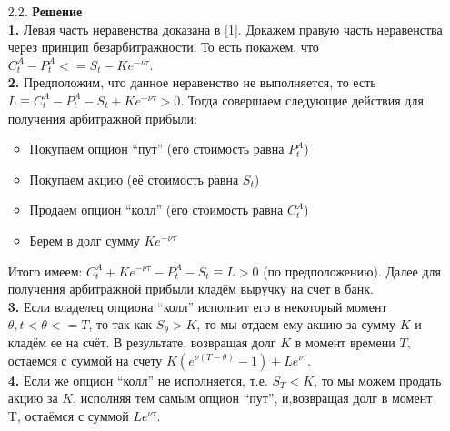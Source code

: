 \documentclass[12pt,a4 paper]{book}
\begin{document}
\begin{enumerate}
\item[2.2.] \textbf{Решение}
\smallskip
\\\textbf{1.} Левая часть неравенства доказана в [1]. Докажем правую часть неравенства через принцип безарбитражности. То есть покажем, что $C^{A}_t-P^{A}_t<=S_t - Ke^{-\nu\tau}$.\\
    \textbf{2.} Предположим, что данное неравенство не выполняется, то есть $L \equiv C^{A}_t - P^{A}_t -S_t+Ke^{-\nu\tau}>0$. Тогда совершаем следующие действия для получения арбитражной прибыли:
    \begin{itemize}
        \item Покупаем опцион “пут” (его стоимость равна $P^{A}_t$)
        \item Покупаем акцию (её стоимость равна $S_t$)
        \item Продаем опцион “колл” (его стоимость равна $C^{A}_t$)
        \item Берем в долг сумму $Ke^{-\nu\tau}$
    \end{itemize}
    Итого имеем: $C^{A}_t+Ke^{-\nu\tau} - P^{A}_t -S_t \equiv L > 0$ (по предположению). Далее для получения арбитражной прибыли кладём выручку на счет в банк.\\
    \textbf{3.} Если владелец опциона “колл” исполнит его в некоторый момент $\theta, t<\theta<=T$, то так как $S_{\theta}>K$, то мы отдаем ему акцию за сумму $K$ и кладём ее на счёт. В результате, возвращая долг $K$ в момент времени $T$, остаемся с суммой на счету $K(e^{\nu(T-\theta)}-1)+Le^{\nu\tau}$.\\
    \textbf{4.} Если же опцион “колл” не исполняется, т.е. $S_T < K$, то мы можем продать акцию за $K$, исполняя тем самым опцион “пут”, и,возвращая долг в момент T, остаёмся с суммой $Le^{\nu\tau}$.\\
\end{enumerate}

\newpage
\end{document}
